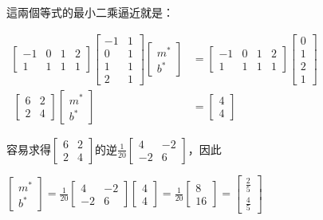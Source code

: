 \documentclass[11pt]{article}
\begin{document}
{這兩個等式的最小二乘逼近就是：

\(\begin{align} \begin{bmatrix} -1 & 0 & 1 & 2 \\ 1 & 1 & 1 & 1 \end{bmatrix} \begin{bmatrix} -1 & 1 \\ 0 & 1 \\ 1 & 1 \\ 2 & 1 \end{bmatrix} \begin{bmatrix} m^*\\ b^* \end{bmatrix} &= \begin{bmatrix} -1 & 0 & 1 & 2 \\ 1 & 1 & 1 & 1 \end{bmatrix} \begin{bmatrix} 0\\ 1\\ 2\\ 1 \end{bmatrix}\\\
\begin{bmatrix} 6 & 2 \\ 2 & 4 \end{bmatrix} \begin{bmatrix} m^*\\ b^* \end{bmatrix} &= \begin{bmatrix} 4\\ 4 \end{bmatrix} \end{align}\)

容易求得\(\begin{bmatrix}6 & 2\\2 & 4\end{bmatrix}\)的逆\(\frac{1}{20}\begin{bmatrix}4 & -2\\-2 & 6\end{bmatrix}\)，因此

\(\begin{bmatrix}m^*\\b^*\end{bmatrix} = \frac{1}{20}\begin{bmatrix}4 & -2\\-2 & 6\end{bmatrix}\begin{bmatrix}4 \\ 4\end{bmatrix} = \frac{1}{20}\begin{bmatrix}8 \\ 16\end{bmatrix} = \begin{bmatrix}\frac{2}{5} \\ \frac{4}{5}\end{bmatrix}\)

}
\end{document}
